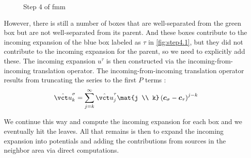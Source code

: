 \begin{enumerate}
\begin{figure}
{{
      }
    }\hspace{4em}
    \caption{Step 4 of \gls{fmm}}
    \label{fig:step4}
  \end{figure}


  However, there is still a number of boxes that are well-separated from the green box but are not well-separated from its parent.
  And these boxes contribute to the incoming expansion of the blue box labeled as $\tau$ in \cref{fig:step4.1}, but they did not contribute to the incoming expansion for the parent, so we need to explicitly add these.
  The incoming expansion $u^\tau$ is then constructed via the incoming-from-incoming translation operator.
  The incoming-from-incoming translation operator results from truncating the series to the first $P$ terms \cite{Martinsson2015}:
  \begin{equation}
    \hat{\vct u}_{k}^{\sigma}=\sum_{j=k}^{\infty} \hat{\vct u}_{j}^{\tau}\mat{j \\ k} \left(\boldsymbol{c}_{\sigma}-\boldsymbol{c}_{\tau}\right)^{j-k}
  \end{equation}

  We continue this way and compute the incoming expansion for each box and we eventually hit the leaves.
  All that remains is then to expand the incoming expansion into potentials and adding the contributions from sources in the neighbor area via direct computations.


\end{enumerate}
